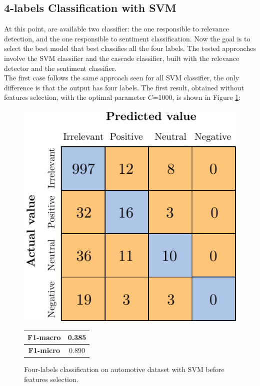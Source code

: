 \subsection{4-labels Classification with SVM}

At this point, are available two classifier: the one responsible to relevance detection, and the one responsible to sentiment classification. Now the goal is to select the best model that best classifies all the four labels. The tested approaches involve the SVM classifier and the cascade classifier, built with the relevance detector and the sentiment classifier.\\
The first case follows the same approach seen for all SVM classifier, the only difference is that the output has four labels. The first result, obtained without features selection, with the optimal parameter $C$=1000, is shown in Figure \ref{fig:ita_4l_svm_bfs}:

\begin{figure}[H]
	\begin{minipage}[b]{0.6\linewidth}
		\centering
		\includegraphics[scale=1]{figures/conf_matrices/ita_4l_svm/ita_4l_svm_bfs.pdf}
	\end{minipage}
	\begin{minipage}[b]{0.3\linewidth}
		\begin{tabular}[b]{ | c | c | } 
			\hline
			\textbf{F1-macro} & 0.385 \\
			\hline
			\textbf{F1-micro} & 0.890 \\ 
			\hline
		\end{tabular}
	\end{minipage}
	\caption{Four-labels classification on automotive dataset with SVM before features selection.}
	\label{fig:ita_4l_svm_bfs}
\end{figure}



